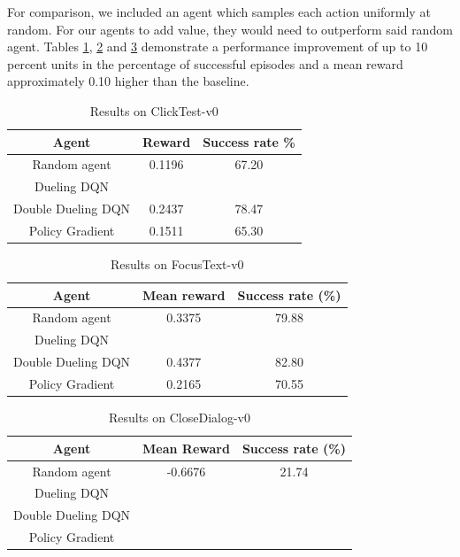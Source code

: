 \documentclass[10pt,journal,compsoc]{IEEEtran}
\begin{document}
For comparison, we included an agent which samples each action uniformly at random. For our agents to add value, they would need to outperform said random agent. Tables \ref{results-clicktest}, \ref{results-focustext} and \ref{results-closedialog} demonstrate a performance improvement of up to 10 percent units in the percentage of successful episodes and a mean reward approximately 0.10 higher than the baseline.

\begin{table}[!h]
\renewcommand{\arraystretch}{1.3}
\caption{Results on ClickTest-v0}
\label{results-clicktest}
\centering
\begin{tabular}{|c||c|c|}
\hline
Agent & Reward & Success rate \% \\
\hline
Random agent & 0.1196 & 67.20\\
\hline
Dueling DQN & &\\
\hline
Double Dueling DQN & 0.2437 & 78.47\\

\hline
Policy Gradient & 0.1511 & 65.30\\
\hline
\end{tabular}
\end{table}

\begin{table}[!h]
\renewcommand{\arraystretch}{1.3}
\caption{Results on FocusText-v0}
\label{results-focustext}
\centering
\begin{tabular}{|c||c|c|}
\hline
Agent & Mean reward & Success rate (\%) \\
\hline
Random agent & 0.3375 & 79.88\\
\hline
Dueling DQN & &\\
\hline
Double Dueling DQN & 0.4377 & 82.80 \\
\hline
Policy Gradient &  0.2165 & 70.55\\
\hline
\end{tabular}
\end{table}


\begin{table}[!h]
\renewcommand{\arraystretch}{1.3}
\caption{Results on CloseDialog-v0}
\label{results-closedialog}
\centering
\begin{tabular}{|c||c|c|}
\hline
Agent & Mean Reward & Success rate (\%) \\
\hline
Random agent & -0.6676 & 21.74 \\
\hline
Dueling DQN & &\\
\hline
Double Dueling DQN & &\\
\hline
Policy Gradient & &\\
\hline
\end{tabular}
\end{table}
\end{document}
